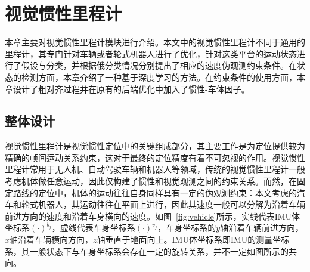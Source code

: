 
\chapter{视觉惯性里程计}

本章主要对视觉惯性里程计模块进行介绍。本文中的视觉惯性里程计不同于通用的里程计，其专门针对车辆或者轮式机器人进行了优化，针对这类平台的运动状态进行了假设与分类，并根据俄分类情况分别提出了相应的速度伪观测约束条件。在状态的检测方面，本章介绍了一种基于深度学习的方法。在约束条件的使用方面，本章设计了粗对齐过程并在原有的后端优化中加入了惯性-车体因子。

\section{整体设计}
视觉惯性里程计是视觉惯性定位中的关键组成部分，其主要工作是为定位提供较为精确的帧间运动关系约束，这对于最终的定位精度有着不可忽视的作用。视觉惯性里程计常用于无人机、自动驾驶车辆和机器人等领域，传统的视觉惯性里程计一般考虑机体做任意运动，因此仅构建了惯性和视觉观测之间的约束关系。而然，在固定路线的定位中，机体的运动往往自身同样具有一定的伪观测约束：本文考虑的汽车和轮式机器人，其运动往往在平面上进行，因此其速度一般可以分解为沿着车辆前进方向的速度和沿着车身横向的速度。如图~\ref{fig:vehicle}所示，实线代表IMU体坐标系$(\cdot)^{b_{j}}$，虚线代表车身坐标系$(\cdot)^{v_{j}}$，车身坐标系的$y$轴沿着车辆前进方向，$x$轴沿着车辆横向方向，$z$轴垂直于地面向上。IMU体坐标系即IMU的测量坐标系，其一般状态下与车身坐标系会存在一定的旋转关系，并不一定如图所示的共向。

